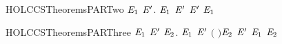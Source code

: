 \newcommand{\HOLCCSTheoremsPAROne}{\UseVerbatim{HOLCCSTheoremsPAROne}}
\begin{SaveVerbatim}{HOLCCSTheoremsPARTwo}
\HOLTokenTurnstile{} \HOLSymConst{\HOLTokenForall{}}  \ensuremath{\HOLBoundVar{E}\sb{\mathrm{1}}} \ensuremath{\HOLBoundVar{E}\sp{\prime}}.  \HOLTokenTransBegin{}\HOLTokenTransEnd \ensuremath{\HOLBoundVar{E}\sb{\mathrm{1}}} \HOLSymConst{\HOLTokenImp{}} \ensuremath{\HOLBoundVar{E}\sp{\prime}} \HOLSymConst{\ensuremath{\mid}}  \HOLTokenTransBegin{}\HOLTokenTransEnd \ensuremath{\HOLBoundVar{E}\sp{\prime}} \HOLSymConst{\ensuremath{\mid}} \ensuremath{\HOLBoundVar{E}\sb{\mathrm{1}}}
\end{SaveVerbatim}
\newcommand{\HOLCCSTheoremsPARTwo}{\UseVerbatim{HOLCCSTheoremsPARTwo}}
\begin{SaveVerbatim}{HOLCCSTheoremsPARThree}
\HOLTokenTurnstile{} \HOLSymConst{\HOLTokenForall{}}  \ensuremath{\HOLBoundVar{E}\sb{\mathrm{1}}} \ensuremath{\HOLBoundVar{E}\sp{\prime}} \ensuremath{\HOLBoundVar{E}\sb{\mathrm{2}}}.
        \HOLTokenTransBegin{} \HOLTokenTransEnd \ensuremath{\HOLBoundVar{E}\sb{\mathrm{1}}} \HOLSymConst{\HOLTokenConj{}} \ensuremath{\HOLBoundVar{E}\sp{\prime}} \HOLTokenTransBegin{} \ensuremath{(} \ensuremath{)}\HOLTokenTransEnd \ensuremath{\HOLBoundVar{E}\sb{\mathrm{2}}} \HOLSymConst{\HOLTokenImp{}}
        \HOLSymConst{\ensuremath{\mid}} \ensuremath{\HOLBoundVar{E}\sp{\prime}} \HOLTokenTransBegin\HOLConst{\ensuremath{\tau}}\HOLTokenTransEnd \ensuremath{\HOLBoundVar{E}\sb{\mathrm{1}}} \HOLSymConst{\ensuremath{\mid}} \ensuremath{\HOLBoundVar{E}\sb{\mathrm{2}}}
\end{SaveVerbatim}
\newcommand{\HOLCCSTheoremsPARThree}{\UseVerbatim{HOLCCSTheoremsPARThree}}
